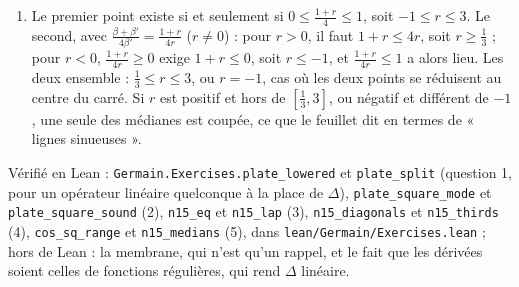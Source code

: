 \documentclass[11pt,a4paper]{article}
\begin{document}
\begin{solution}
\begin{enumerate}
  $x = \frac A3$ et $x = \frac{2A}{3}$ : deux droites parallèles à un côté, au tiers de
  la largeur.
\item Le premier point existe si et seulement si $0 \le \frac{1+r}{4} \le 1$, soit
  $-1 \le r \le 3$. Le second, avec $\frac{\beta+\beta'}{4\beta'} = \frac{1+r}{4r}$
  ($r \neq 0$) : pour $r > 0$, il faut $1 + r \le 4r$, soit $r \ge \frac13$ ; pour
  $r < 0$, $\frac{1+r}{4r} \ge 0$ exige $1 + r \le 0$, soit $r \le -1$, et
  $\frac{1+r}{4r} \le 1$ a alors lieu. Les deux ensemble : $\frac13 \le r \le 3$, ou
  $r = -1$, cas où les deux points se réduisent au centre du carré. Si $r$ est positif
  et hors de $[\frac13, 3]$, ou négatif et différent de $-1$, une seule des médianes
  est coupée, ce que le feuillet dit en termes de « lignes sinueuses ».
\end{enumerate}

Vérifié en Lean : \texttt{Germain.Exercises.plate\_lowered} et \texttt{plate\_split}
(question 1, pour un opérateur linéaire quelconque à la place de $\Delta$),
\texttt{plate\_square\_mode} et \texttt{plate\_square\_sound} (2), \texttt{n15\_eq} et
\texttt{n15\_lap} (3), \texttt{n15\_diagonals} et \texttt{n15\_thirds} (4),
\texttt{cos\_sq\_range} et \texttt{n15\_medians} (5), dans \texttt{lean/Germain/Exercises.lean} ; hors de
Lean : la membrane, qui n'est qu'un rappel, et le fait que les dérivées soient
celles de fonctions régulières, qui rend $\Delta$ linéaire.
\end{solution}
\end{document}
